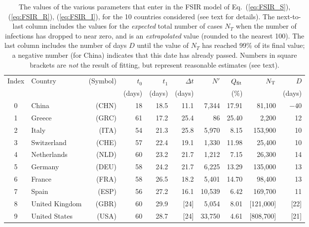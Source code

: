 \documentclass[aps,preprint]{revtex4}
\newcommand{\Dt}{{\Delta t}}
\newcommand{\NT}{{N_{\rm T}}}
\begin{document}
\begin{table}
\begin{center}
\begin{tabular}{| c |l r | r | r | r | r | r | r | r|}\hline
Index & Country & (Symbol) &  $\; \; \; \; t_0 $  & $\; \; t_1$ & $\Dt$ & $N'$  & $Q_{\rm fit}$ & $\NT$ &  $D$ \\ 
 &  &  & (days)  & (days) & (days) &  & (\%) &  & (days) \\  \hline 
0 & China & (CHN) & 18 & 18.5 & 11.1 & 7,344 & 17.91 & 81,100 & $-40$ \\
1 & Greece & (GRC) & 61 & 17.2 & 25.4 & 86 & 25.40 & 2,200 & 12 \\
2 & Italy & (ITA) & 54 & 21.3 & 25.8 & 5,970 & 8.15 & 153,900 & 10 \\
3 & Switzerland & (CHE) & 57 & 22.4 & 19.1 & 1,330 & 11.98 & 25,400  & 10 \\
4 & Netherlands & (NLD) & 60 & 23.2 & 21.7 & 1,212 & 7.15 & 26,300 & 14 \\
5 & Germany & (DEU) & 58 & 24.2 & 21.7 & 6,225 & 13.29 & 135,000 & 13 \\
6 & France & (FRA) & 58 & 26.5 & 18.2 & 5,401 & 14.70 & 98,400 & 13 \\
7 & Spain & (ESP) & 56 & 27.2 & 16.1 & 10,539 & 6.42 & 169,700 & 11\\
8 & United Kingdom & (GBR) & 60 & 29.9 & [24] & 5,054 & 8.01 & [121,000] & [22] \\
9 & United States & (USA) & 60 & 28.7 & [24] & 33,750 & 4.61 & [808,700] & [21] \\
\hline
\end{tabular}
\caption{
\label{table:parameters}
\small{
The values of the various parameters that enter in the FSIR model of Eq.~(\ref{eq:FSIR_S}), 
(\ref{eq:FSIR_R}), (\ref{eq:FSIR_I}), for the 10 countries considered (see text 
for details). The next-to-last column includes the values for the {\em expected} total number 
of cases $N_T$ when the number of infections has dropped to near zero, and is an 
{\em extrapolated} value (rounded to the nearest 100).  The last column includes 
the number of days $D$ until the value of $N_T$ has reached 99\% of its final value;
a negative number (for China) indicates that this date has already passed.  Numbers in 
square brackets are {\em not} the result of fitting, but represent reasonable  estimates (see text). 
}}
\end{center}
\end{table}
\end{document}
